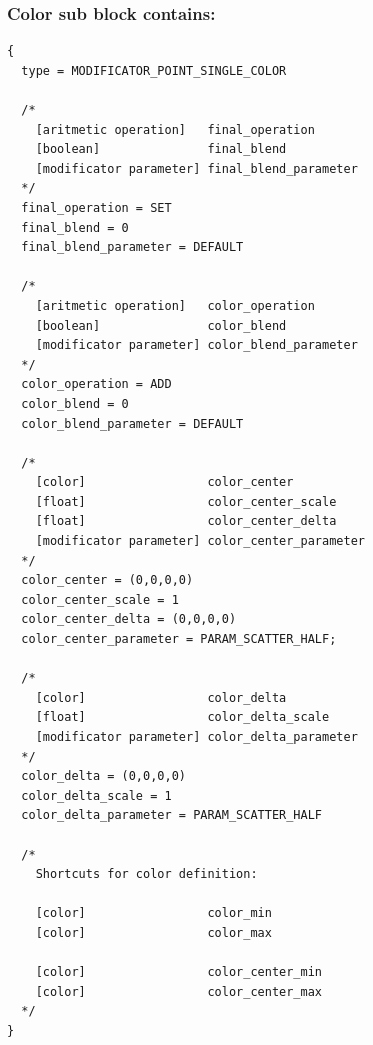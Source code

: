 \documentclass[9pt]{article}
\begin{document}
\clearpage
\subsubsection*{Color sub block contains:}
\begin{verbatim}
{
  type = MODIFICATOR_POINT_SINGLE_COLOR

  /*  
    [aritmetic operation]   final_operation
    [boolean]               final_blend
    [modificator parameter] final_blend_parameter
  */
  final_operation = SET
  final_blend = 0
  final_blend_parameter = DEFAULT
  
  /*
    [aritmetic operation]   color_operation
    [boolean]               color_blend
    [modificator parameter] color_blend_parameter
  */
  color_operation = ADD
  color_blend = 0
  color_blend_parameter = DEFAULT
  
  /*
    [color]                 color_center
    [float]                 color_center_scale
    [float]                 color_center_delta
    [modificator parameter] color_center_parameter
  */
  color_center = (0,0,0,0)
  color_center_scale = 1
  color_center_delta = (0,0,0,0)
  color_center_parameter = PARAM_SCATTER_HALF;
  
  /*
    [color]                 color_delta
    [float]                 color_delta_scale
    [modificator parameter] color_delta_parameter
  */
  color_delta = (0,0,0,0)
  color_delta_scale = 1
  color_delta_parameter = PARAM_SCATTER_HALF
  
  /*
    Shortcuts for color definition:
    
    [color]                 color_min
    [color]                 color_max

    [color]                 color_center_min
    [color]                 color_center_max
  */  
}
\end{verbatim}
\end{document}
